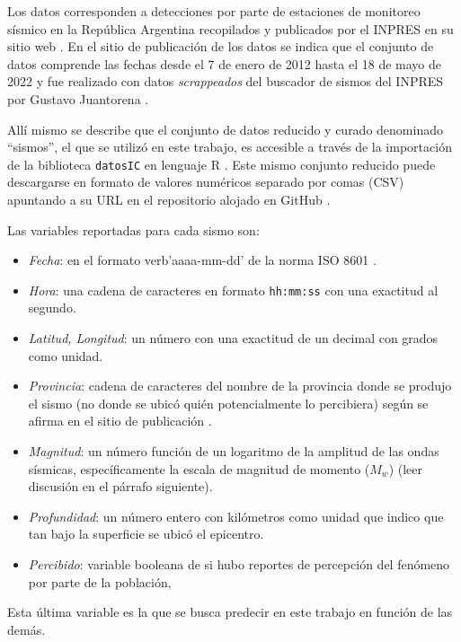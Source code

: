 \documentclass[a4paper]{report}
\begin{document}
Los datos corresponden a detecciones por parte de estaciones de monitoreo sísmico en la República Argentina recopilados y publicados por el INPRES en su sitio web \cite{noauthor_buscador_nodate}.
En el sitio de publicación de los datos se indica que el conjunto de datos comprende las fechas desde el 7 de enero de 2012 hasta el 18 de mayo de 2022 y fue realizado con datos \emph{scrappeados} del buscador de sismos del INPRES por Gustavo Juantorena \cite[sección 4.1]{daniela_parada_ic-datasets-docencia_nodate}. 

Allí mismo se describe que el conjunto de datos reducido y curado denominado ``sismos'', el que se utilizó en este trabajo, es accesible a través de la importación de la biblioteca \texttt{datosIC} en lenguaje R \cite[sección 5.1.1]{daniela_parada_ic-datasets-docencia_nodate}.
Este mismo conjunto reducido puede descargarse en formato de valores numéricos separado por comas (CSV) apuntando a su URL en el repositorio alojado en GitHub \cite{daniela_parada_sismos-arg_nodate}. 

Las variables reportadas para cada sismo son:
\begin{itemize}
	\item \emph{Fecha}: en el formato verb'aaaa-mm-dd' de la norma ISO 8601 \cite{noauthor_iso_2019}.
	\item \emph{Hora}: una cadena de caracteres en formato \verb'hh:mm:ss' con una exactitud al segundo.
	\item \emph{Latitud, Longitud}: un número con una exactitud de un decimal con grados como unidad.
	\item \emph{Provincia}: cadena de caracteres del nombre de la provincia donde se produjo el sismo (no donde se ubicó quién potencialmente lo percibiera) según se afirma en el sitio de publicación \cite[5.1.1]{daniela_parada_ic-datasets-docencia_nodate}.
	\item \emph{Magnitud}: un número función de un logaritmo de la amplitud de las ondas sísmicas, específicamente la escala de magnitud de momento (\(M_w\)) (leer discusión en el párrafo siguiente).
	\item \emph{Profundidad}: un número entero con kilómetros como unidad que indico que tan bajo la superficie se ubicó el epicentro.
	\item \emph{Percibido}: variable booleana de si hubo reportes de percepción del fenómeno por parte de la población, 
\end{itemize}
Esta última variable es la que se busca predecir en este trabajo en función de las demás. 
\end{document}
